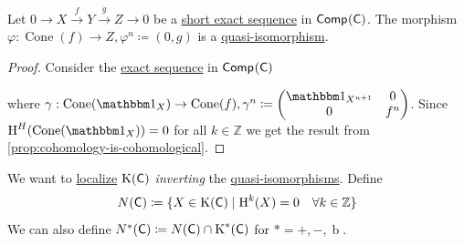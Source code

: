 \documentclass[../../main]{subfiles}
\begin{document}
\begin{corollary}
  Let \(0 \to X \xrightarrow{f} Y \xrightarrow{g} Z \to 0\) be a \hyperref[def:exact-sequence]{short exact sequence} in \(\mathsf{Comp}^{}(\mathsf{C})\).
  The morphism \(\varphi: \operatorname{Cone}(f) \to Z, \varphi^{n} \coloneq (0, g)\) is a \hyperref[def:quasi-isomorphism]{quasi-isomorphism}.
\end{corollary}
\begin{proof}
  Consider the \hyperref[def:exact-sequence]{exact sequence} in \(\mathsf{Comp}^{}(\mathsf{C})\)
  \begin{center}
  \end{center}
  where \(\gamma: \operatorname{Cone}(\id_{X}) \to \operatorname{Cone}(f), \gamma^{n} \coloneq \begin{pmatrix} \id_{X^{n+1}} & 0 \\ 0 & f^{n} \end{pmatrix}\).
  Since \(\cohomology{H}(\operatorname{Cone}(\id_{X})) = 0\) for all \(k \in \mathbb{Z}\) we get the result from \autoref{prop:cohomology-is-cohomological}.
\end{proof}

We want to \hyperref[def:localization-category]{localize} \(\operatorname{K}(\mathsf{C})\) \textit{inverting} the \hyperref[def:quasi-isomorphism]{quasi-isomorphisms}.
Define
\begin{equation*}
  N(\mathsf{C}) \coloneq \{X \in \operatorname{K}(\mathsf{C}) \mid \operatorname{H}^{k}(X) = 0 \quad \forall k \in \mathbb{Z} \}
\end{equation*}
We can also define \(N^{\ast}(\mathsf{C}) \coloneq N(\mathsf{C}) \cap \operatorname{K}^{\ast}(\mathsf{C})\) for \(\ast = +, -, \operatorname{b}\).
\end{document}
